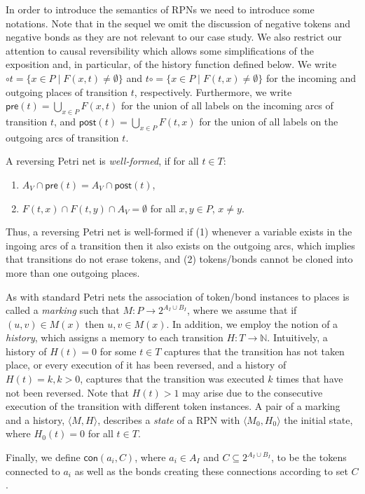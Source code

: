 \documentclass[runningheads]{llncs}
\newcommand{\PN}{reversing Petri net }
\newcommand{\guard}[1]{\mathsf{pre}(#1)}
\newcommand{\effects}[1]{\mathsf{post}(#1)}
\newcommand{\connected}{\mathsf{con}}
\newcommand{\state}[2]{\langle {#1}, {#2}\rangle}
\begin{document}
In order to introduce the semantics of RPNs we need to introduce some notations. Note that in 
the sequel we omit the discussion of negative tokens and negative bonds as they are not relevant to our
case study. We also restrict  our attention to causal reversibility which allows some simplifications
of the exposition and, in particular, of the history function defined below.
We write 
$\circ t =   \{x\in P\mid  F(x,t)\neq \emptyset\}$ and  
$ t\circ = \{x\in P\mid F(t,x)\neq \emptyset\}$
for the incoming and outgoing places of transition
$t$, respectively. Furthermore, we write
$\guard{t}  =   \bigcup_{x\in P} F(x,t)$ 
for the union of all labels on the
incoming arcs of  transition $t$, 
and $\effects{t}  =   \bigcup_{x\in P} F(t,x)$
for the union of all labels on the 
outgoing arcs of transition $t$. 
\begin{definition}\label{well-formed}{\rm 
		A \PN is \emph{well-formed}, if for all $t\in T$:
		\begin{enumerate}
			\item $A_V\cap \guard{t} = A_V\cap \effects{t}$,
			\item $ F(t,x)\cap F(t,y)\cap A_V=\emptyset$ for all $x,y\in P$, $x\neq y $. 
		\end{enumerate}
}\end{definition}
Thus, a \PN is well-formed if (1) whenever a variable exists in
the ingoing arcs of a transition then it also exists on the outgoing arcs, which implies that transitions do not
erase tokens, and  (2) 
tokens/bonds cannot be cloned into more than one outgoing places.

As with standard Petri nets the association of token/bond instances to places is called a \emph{marking}  such that 
$M: P\rightarrow 2^{A_I\cup B_I}$, where we assume that if $(u,v)\in M(x)$ then $u, v\in M(x)$. 
In addition, we employ the notion of a \emph{history}, which assigns a memory to each
transition $H : T\rightarrow \mathbb{N}$. 
Intuitively, a history of $H(t) = 0$ for some $t \in T$ captures that the transition has not taken place, or 
every execution of it has been reversed, and a history
of $ H(t)=k, k>0$, captures that the transition was executed  $k$ times that have not been  reversed.
Note that $H(t)>1$ may
arise due to the consecutive execution of the transition with different token
instances. A pair of a marking and a history, $\state{M}{H}$, describes a \emph{state} of a RPN 
with $\state{M_0}{H_0}$ the initial state, where $H_0(t) = 0$ for all $t\in T$. 

Finally, we define $\connected(a_i,C)$, where $a_i\in A_I$ and $C\subseteq 2^{A_I\cup B_I}$,
to be the tokens connected
to $a_i$  as well as the bonds creating these connections according to 
set $C$. 
\end{document}
